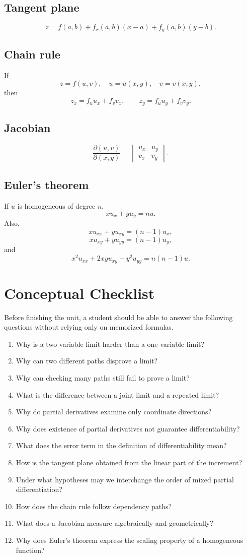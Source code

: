 \documentclass[11pt,oneside]{book}
\theoremstyle{studentthm}
\theoremstyle{definition}
\begin{document}
\subsection*{Tangent plane}
\[
z=f(a,b)+f_x(a,b)(x-a)+f_y(a,b)(y-b).
\]

\subsection*{Chain rule}
If
\[
z=f(u,v),\quad u=u(x,y),\quad v=v(x,y),
\]
then
\[
z_x=f_u u_x+f_v v_x,
\qquad
z_y=f_u u_y+f_v v_y.
\]

\subsection*{Jacobian}
\[
\frac{\partial(u,v)}{\partial(x,y)}
=
\begin{vmatrix}
u_x&u_y\\
v_x&v_y
\end{vmatrix}.
\]

\subsection*{Euler's theorem}
If \(u\) is homogeneous of degree \(n\),
\[
xu_x+yu_y=nu.
\]
Also,
\[
xu_{xx}+yu_{xy}=(n-1)u_x,
\]
\[
xu_{xy}+yu_{yy}=(n-1)u_y,
\]
and
\[
x^2u_{xx}+2xyu_{xy}+y^2u_{yy}=n(n-1)u.
\]


\section{Conceptual Checklist}

Before finishing the unit, a student should be able to answer the
following questions without relying only on memorized formulas.

\begin{enumerate}
\item Why is a two-variable limit harder than a one-variable limit?
\item Why can two different paths disprove a limit?
\item Why can checking many paths still fail to prove a limit?
\item What is the difference between a joint limit and a repeated
limit?
\item Why do partial derivatives examine only coordinate directions?
\item Why does existence of partial derivatives not guarantee
differentiability?
\item What does the error term in the definition of differentiability
mean?
\item How is the tangent plane obtained from the linear part of the
increment?
\item Under what hypotheses may we interchange the order of mixed
partial differentiation?
\item How does the chain rule follow dependency paths?
\item What does a Jacobian measure algebraically and geometrically?
\item Why does Euler's theorem express the scaling property of a
homogeneous function?
\end{enumerate}
\end{document}
